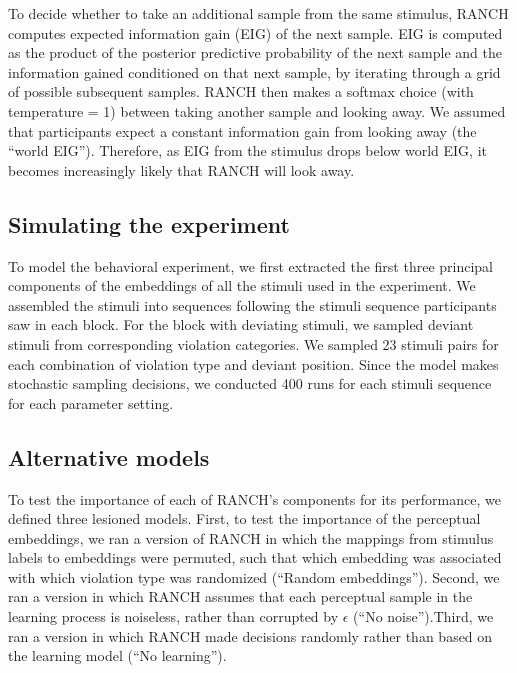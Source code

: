 \documentclass[10pt, letterpaper]{article}
\begin{document}
To decide whether to take an additional sample from the same stimulus,
RANCH computes expected information gain (EIG) of the next sample. EIG
is computed as the product of the posterior predictive probability of
the next sample and the information gained conditioned on that next
sample, by iterating through a grid of possible subsequent samples.
RANCH then makes a softmax choice (with temperature = 1) between taking
another sample and looking away. We assumed that participants expect a
constant information gain from looking away (the ``world EIG'').
Therefore, as EIG from the stimulus drops below world EIG, it becomes
increasingly likely that RANCH will look away.

\hypertarget{simulating-the-experiment}{%
\subsection{Simulating the experiment}\label{simulating-the-experiment}}

To model the behavioral experiment, we first extracted the first three
principal components of the embeddings of all the stimuli used in the
experiment. We assembled the stimuli into sequences following the
stimuli sequence participants saw in each block. For the block with
deviating stimuli, we sampled deviant stimuli from corresponding
violation categories. We sampled 23 stimuli pairs for each combination
of violation type and deviant position. Since the model makes stochastic
sampling decisions, we conducted 400 runs for each stimuli sequence for
each parameter setting.

\hypertarget{alternative-models}{%
\subsection{Alternative models}\label{alternative-models}}

To test the importance of each of RANCH's components for its
performance, we defined three lesioned models. First, to test the
importance of the perceptual embeddings, we ran a version of RANCH in
which the mappings from stimulus labels to embeddings were permuted,
such that which embedding was associated with which violation type was
randomized (``Random embeddings''). Second, we ran a version in which
RANCH assumes that each perceptual sample in the learning process is
noiseless, rather than corrupted by \(\epsilon\) (``No noise'').Third,
we ran a version in which RANCH made decisions randomly rather than
based on the learning model (``No learning'').
\end{document}
